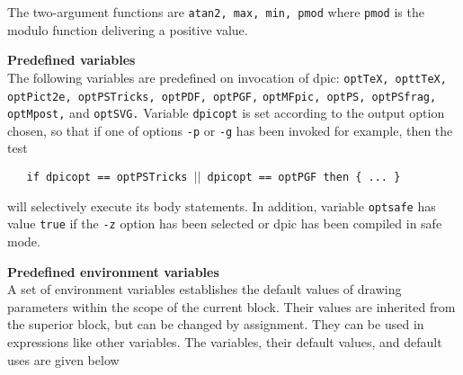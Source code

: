 The two-argument functions are
{\tt atan2,\ max,\ min,\ pmod}
where
{\tt pmod}
is the modulo function delivering a positive value.
\par\hskip-2pc{\bf Predefined variables}\\
The following variables are predefined on invocation of dpic:
{\tt optTeX, opttTeX, optPict2e, optPSTricks, optPDF, optPGF,}
{\tt optMFpic, optPS, optPSfrag,}
\\\hbox{}\hskip-1pt
{\tt optMpost,}
and
{\tt optSVG.}
Variable
{\tt dpicopt}
is set according to the output option chosen, so that if one of options
{\tt -p}
or
{\tt -g}
has been invoked for example, then the test

{\tt \ \ \ if\ dpicopt\ ==\ optPSTricks\ $|$$|$\ dpicopt\ ==\ optPGF\ then\ \{\ ...\ \}}

will selectively execute its body statements.
In addition, variable
{\tt optsafe}
has value
{\tt true}
if the
{\tt -z}
option has been selected or dpic has been compiled in safe mode.
\par\hskip-2pc{\bf Predefined environment variables}\\
A set of environment variables establishes the default values of drawing
parameters within the scope of the current block.
Their values are inherited from the superior block, but can be changed
by assignment.
They can be used in expressions like other variables.
The variables, their default values, and default uses are given below

